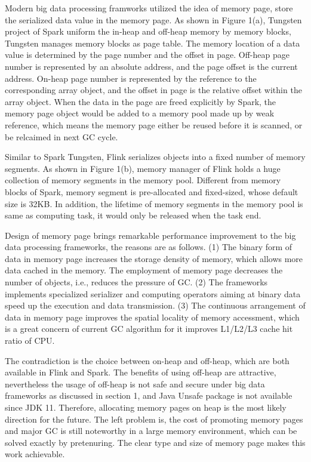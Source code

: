 \documentclass[sigplan, screen]{acmart}
\begin{document}
Modern big data processing framworks utilized the idea of memory page, store the serialized data value in the memory page. As shown in Figure 1(a), Tungsten project of Spark uniform the in-heap and off-heap memory by memory blocks,
Tungsten manages memory blocks as page table. The memory location of a data value is determined by the page number and the offset in page. Off-heap page number is represented by an 
absolute address, and the page offset is the current address. On-heap page number is represented by the reference to the corresponding array object, and the offset in page 
is the relative offset within the array object. When the data in the page are freed explicitly by Spark, the memory page object would be added to a memory pool made up by weak reference, 
which means the memory page either be reused before it is scanned, or be relcaimed in next GC cycle. 

Similar to Spark Tungsten, Flink serializes objects into a fixed number of memory segments. As shown in Figure 1(b), memory manager of Flink holds a huge collection of 
memory segments in the memory pool. Different from memory blocks of Spark, memory segment is pre-allocated and fixed-sized, whose default size is 32KB. In addition, the lifetime of memory segments in the memory pool is 
same as computing task, it would only be released when the task end.

Design of memory page brings remarkable performance improvement to the big data processing frameworks, the reasons are as follows. (1) The binary form of data in memory page increases the storage density of memory, which allows more data cached
in the memory. The employment of memory page decreases the number of objects, i.e., reduces the pressure of GC. (2) The frameworks implements specialized serializer and computing
operators aiming at binary data speed up the execution and data transmission. (3) The continuous arrangement of data in memory page improves the spatial locality of memory accessment, 
 which is a great concern of current GC algorithm for it improves L1/L2/L3 cache hit ratio of CPU\cite{yang2020improving,li2019scissorgc}. 
 
 The contradiction is the choice between on-heap and off-heap, which are both available in Flink and Spark. The benefits of using off-heap are attractive, nevertheless the usage of off-heap is not safe and secure under big data frameworks as discussed in section 1, and Java Unsafe package is not available since JDK 11\cite{UnsafeRemove}. 
 Therefore, allocating memory pages on heap is the most likely direction for the future. The left problem is, the cost of promoting memory pages and major GC is still noteworthy
 in a large memory environment\cite{MinorGCLong}, which can be solved exactly by pretenuring. The clear type and size of memory page makes this work achievable.
\end{document}

